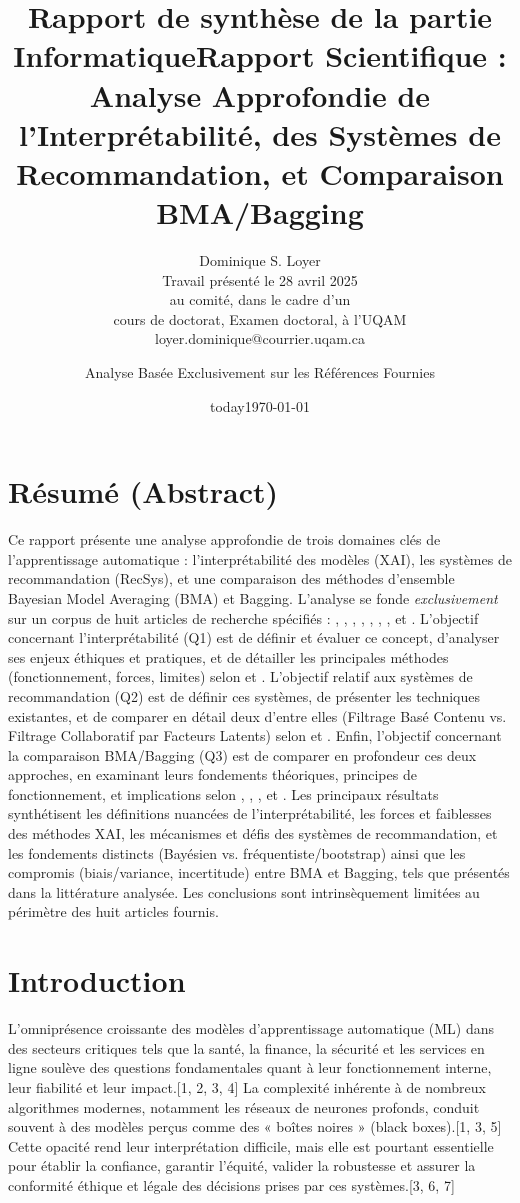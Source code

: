 \documentclass[11pt,a4paper]{article}
\title{Rapport de synthèse de la partie Informatique} %
\author{Dominique S. Loyer\\
  Travail présenté le 28 avril 2025 \\
  au comité, dans le cadre d'un \\
  cours de doctorat, Examen doctoral, à l'UQAM \\
  loyer.dominique@courrier.uqam.ca \\}
\date{today}
\title{Rapport Scientifique : Analyse Approfondie de l'Interprétabilité, des Systèmes de Recommandation, et Comparaison BMA/Bagging}
\author{Analyse Basée Exclusivement sur les Références Fournies} %
\date{\today}
\begin{document}
\maketitle

\section*{Résumé (Abstract)}
Ce rapport présente une analyse approfondie de trois domaines clés de l'apprentissage automatique : l'interprétabilité des modèles (XAI), les systèmes de recommandation (RecSys), et une comparaison des méthodes d'ensemble Bayesian Model Averaging (BMA) et Bagging. L'analyse se fonde \textit{exclusivement} sur un corpus de huit articles de recherche spécifiés : \citet{Doran2017}, \citet{Burkart2021}, \citet{Ko2022}, \citet{Koren2011}, \citet{Domingos2012}, \citet{Solomonoff1964}, \citet{Wasserman2000}, et \citet{Domingos1997}. L'objectif concernant l'interprétabilité (Q1) est de définir et évaluer ce concept, d'analyser ses enjeux éthiques et pratiques, et de détailler les principales méthodes (fonctionnement, forces, limites) selon \citet{Doran2017} et \citet{Burkart2021}. L'objectif relatif aux systèmes de recommandation (Q2) est de définir ces systèmes, de présenter les techniques existantes, et de comparer en détail deux d'entre elles (Filtrage Basé Contenu vs. Filtrage Collaboratif par Facteurs Latents) selon \citet{Ko2022} et \citet{Koren2011}. Enfin, l'objectif concernant la comparaison BMA/Bagging (Q3) est de comparer en profondeur ces deux approches, en examinant leurs fondements théoriques, principes de fonctionnement, et implications selon \citet{Wasserman2000}, \citet{Domingos1997}, \citet{Domingos2012}, et \citet{Solomonoff1964}. Les principaux résultats synthétisent les définitions nuancées de l'interprétabilité, les forces et faiblesses des méthodes XAI, les mécanismes et défis des systèmes de recommandation, et les fondements distincts (Bayésien vs. fréquentiste/bootstrap) ainsi que les compromis (biais/variance, incertitude) entre BMA et Bagging, tels que présentés dans la littérature analysée. Les conclusions sont intrinsèquement limitées au périmètre des huit articles fournis.

\section{Introduction}

L'omniprésence croissante des modèles d'apprentissage automatique (ML) dans des secteurs critiques tels que la santé, la finance, la sécurité et les services en ligne soulève des questions fondamentales quant à leur fonctionnement interne, leur fiabilité et leur impact.[1, 2, 3, 4] La complexité inhérente à de nombreux algorithmes modernes, notamment les réseaux de neurones profonds, conduit souvent à des modèles perçus comme des « boîtes noires » (black boxes).[1, 3, 5] Cette opacité rend leur interprétation difficile, mais elle est pourtant essentielle pour établir la confiance, garantir l'équité, valider la robustesse et assurer la conformité éthique et légale des décisions prises par ces systèmes.[3, 6, 7]
\end{document}
